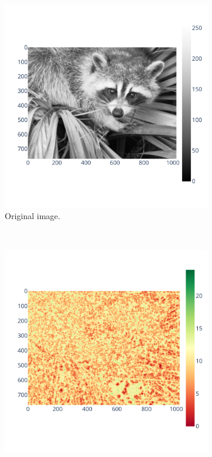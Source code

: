 \documentclass[11pt]{article}
\begin{document}
\begin{figure}
\centering
\begin{subfigure}{.3\linewidth}
    \includegraphics[width=\linewidth]{figure/bspline/original_image.pdf}
    \caption{Original image.}
    \label{fig:bspline_original_image}
\end{subfigure}\\
\begin{subfigure}{0.3\linewidth}
    \includegraphics[width=\linewidth]{figure/bspline/bspline_sig.pdf}

\end{subfigure}
\end{figure}
\end{document}

